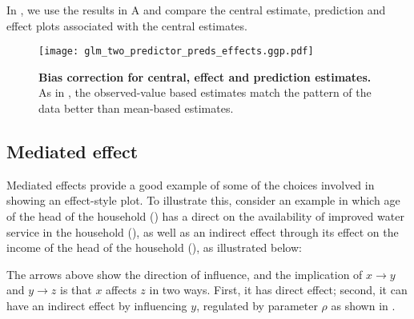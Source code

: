 In , we use the results in A and compare the central estimate, prediction and effect plots associated with the central estimates. 
%
\begin{figure}
\begin{center}
\texttt{[image: glm\_two\_predictor\_preds\_effects.ggp.pdf]}
\end{center}
\caption{{\bf Bias correction for central, effect and prediction estimates.} 
As in , the observed-value based estimates match the pattern of the data better than mean-based estimates.}
\label{fig:pred_bin_prediction_effects_plots}
\end{figure}

\subsection{Mediated effect}

Mediated effects provide a good example of some of the choices involved in showing an effect-style plot.
To illustrate this, consider an example in which age of the head of the household () has a direct on the availability of improved water service in the household (), as well as an indirect effect through its effect on the income of the head of the household (), as illustrated below:
%
\begin{center}
\end{center}
%
The arrows above show the direction of influence, and the implication of $x\rightarrow y$ and $y \rightarrow z$ is that $x$ affects $z$ in two ways. First, it has direct effect; second, it can have an indirect effect by influencing $y$, regulated by parameter $\rho$ as shown in .

